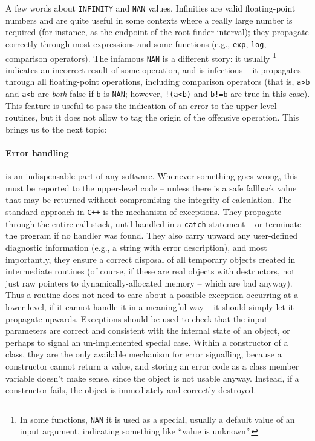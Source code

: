 \documentclass[12pt]{article}
\newcommand{\Cpp}  {\texttt{C++}\xspace}
\let\oldparagraph\paragraph
\renewcommand{\paragraph}[1]{\vspace{-2mm}\oldparagraph{#1}}
\begin{document}
A few words about \texttt{INFINITY} and \texttt{NAN} values. Infinities are valid floating-point numbers and are quite useful in some contexts where a really large number is required (for instance, as the endpoint of the root-finder interval); they propagate correctly through most expressions and some functions (e.g., \texttt{exp}, \texttt{log}, comparison operators). The infamous \texttt{NAN} is a different story: it usually%
\footnote{In some functions, \texttt{NAN} it is used as a special, usually a default value of an input argument, indicating something like ``value is unknown''.}
indicates an incorrect result of some operation, and is infectious -- it propagates through all floating-point operations, including comparison operators (that is, \texttt{a>b} and \texttt{a<b} are \textit{both} false if \texttt{b} is \texttt{NAN}; however, \texttt{!(a<b)} and \texttt{b!=b} are true in this case). This feature is useful to pass the indication of an error to the upper-level routines, but it does not allow to tag the origin of the offensive operation. This brings us to the next topic:

\paragraph{Error handling} \label{sec:Exceptions}  is an indispensable part of any software. Whenever something goes wrong, this must be reported to the upper-level code -- unless there is a safe fallback value that may be returned without compromising the integrity of calculation. The standard approach in \Cpp is the mechanism of exceptions. They propagate through the entire call stack, until handled in a \texttt{catch} statement -- or terminate the program if no handler was found. They also carry upward any user-defined diagnostic information (e.g., a string with error description), and most importantly, they ensure a correct disposal of all temporary objects created in intermediate routines (of course, if these are real objects with destructors, not just raw pointers to dynamically-allocated memory -- which are bad anyway). 
Thus a routine does not need to care about a possible exception occurring at a lower level, if it cannot handle it in a meaningful way -- it should simply let it propagate upwards. Exceptions should be used to check that the input parameters are correct and consistent with the internal state of an object, or perhaps to signal an un-implemented special case. Within a constructor of a class, they are the only available mechanism for error signalling, because a constructor cannot return a value, and storing an error code as a class member variable doesn't make sense, since the object is not usable anyway. Instead, if a constructor fails, the object is immediately and correctly destroyed.
\end{document}
